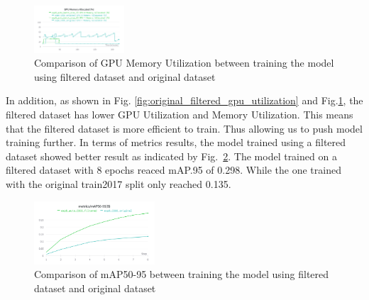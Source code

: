\documentclass[conference]{IEEEtran}
\begin{document}
\begin{figure}[h!]
\centering
\includegraphics[width=0.3\textwidth,keepaspectratio]{memory_utilization_comparison_original_and_filtered.png}
\caption{Comparison of GPU Memory Utilization between training the model using filtered dataset and original dataset}
\label{fig:original_filtered_memory_utilization}
\end{figure}
In addition, as shown in Fig. \ref{fig:original_filtered_gpu_utilization} and Fig.\ref{fig:original_filtered_memory_utilization}, the filtered dataset has lower GPU Utilization and Memory Utilization. This means that the filtered dataset is more efficient to train.
Thus allowing us to push model training further.
In terms of metrics results, the model trained using a filtered dataset showed better result as indicated by Fig.~\ref{fig:training_comparison}. The model trained on a filtered dataset with 8 epochs reaced mAP.95 of 0.298. While the one trained with the original train2017 split only reached 0.135.
\begin{figure}
\centering
\includegraphics[width=0.4\textwidth,keepaspectratio]{comparison_mAP_filtered.png}
\caption{Comparison of mAP50-95 between training the model using filtered dataset and original dataset}
\label{fig:training_comparison}
\end{figure}
\end{document}
